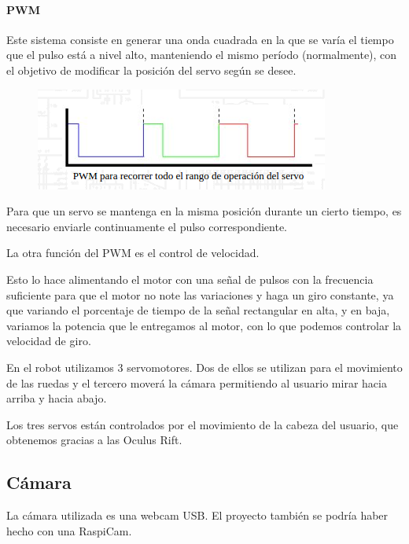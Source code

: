 \documentclass[twoside, 12pt]{epstfg}
\begin{document}
\paragraph{PWM}

Este sistema consiste en generar una onda cuadrada en la que se varía el tiempo que el pulso está a nivel alto, manteniendo el mismo período (normalmente), con el objetivo de modificar la posición del servo según se desee.

\begin{figure}[h]
	\centerline{
		\mbox{\includegraphics[width=.80\textwidth]{images/ondaServo.png}}
	}
	
\end{figure}



Para que un servo se mantenga en la misma posición durante un cierto tiempo, es necesario enviarle continuamente el pulso correspondiente.


La otra función del PWM es el control de velocidad.

Esto lo hace alimentando el motor con una señal de pulsos con la frecuencia suficiente para que el motor no note las variaciones y haga un giro constante, ya que variando el porcentaje de tiempo de la señal rectangular en alta, y en baja, variamos la potencia que le entregamos al motor, con lo que podemos controlar la velocidad de giro.

En el robot utilizamos 3 servomotores.
Dos de ellos se utilizan para el movimiento de las ruedas y el tercero moverá la cámara permitiendo al usuario mirar hacia arriba y hacia abajo.

Los tres servos están controlados por el movimiento de la cabeza del usuario, que obtenemos gracias a las Oculus Rift.

\subsection{Cámara}

La cámara utilizada es una webcam USB. El proyecto también se podría haber hecho con una RaspiCam.
\end{document}
